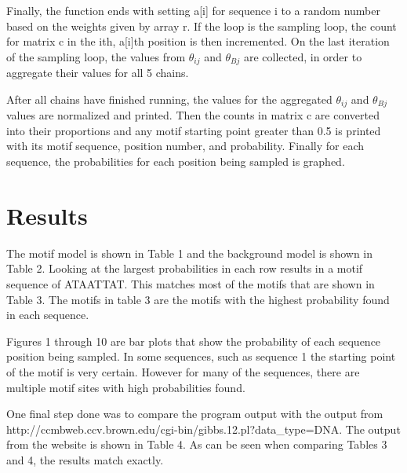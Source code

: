 \documentclass{acm_proc_article-sp}
\begin{document}
Finally, the function ends with setting a[i] for sequence i to a random number based on the weights given by array r.  If the loop is the sampling loop, the count for matrix c in the ith, a[i]th position is then incremented.  On the last iteration of the sampling loop, the values from  $\theta_{ij}$ and  $\theta_{Bj}$ are collected, in order to aggregate their values for all 5 chains.  

After all chains have finished running, the values for the aggregated $\theta_{ij}$ and  $\theta_{Bj}$ values are normalized and printed.  Then the counts in matrix c are converted into their proportions and any motif starting point greater than 0.5 is printed with its motif sequence, position number, and probability.  Finally for each sequence, the probabilities for each position being sampled is graphed.  


\section{Results}
The motif model is shown in Table 1 and the background model is shown in Table 2.  Looking at the largest probabilities in each row results in a motif sequence of ATAATTAT.  This matches most of the motifs that are shown in Table 3.  The motifs in table 3 are the motifs with the highest probability found in each sequence.  

Figures 1 through 10 are bar plots that show the probability of each sequence position being sampled.  In some sequences, such as sequence 1 the starting point of the motif is very certain.  However for many of the sequences, there are multiple motif sites with high probabilities found.

One final step done was to compare the program output with the output from http://ccmbweb.ccv.brown.edu/cgi-bin/gibbs.12.pl?data\_type=DNA.  The output from the website is shown in Table 4.  As can be seen when comparing Tables 3 and 4, the results match exactly.  
\end{document}
